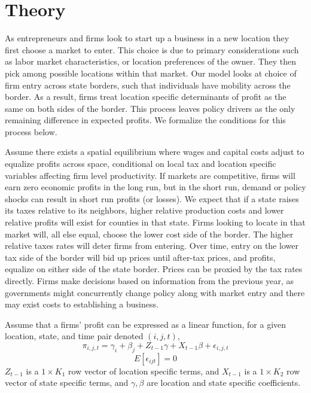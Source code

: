 \section{Theory}

As entrepreneurs and firms look to start up a business in a new location they first choose a market to enter. This choice is due to primary considerations such as labor market characteristics, or location preferences of the owner. They then pick among possible locations within that market. Our model looks at choice of firm entry across state borders, such that individuals have mobility across the border. As a result, firms treat location specific determinants of profit as the same on both sides of the border. This process leaves policy drivers as the only remaining difference in expected profits. We formalize the conditions for this process below. 

Assume there exists a spatial equilibrium where wages and capital costs adjust to equalize profits across space, conditional on local tax and location specific variables affecting firm level productivity. If markets are competitive, firms will earn zero economic profits in the long run, but in the short run, demand or policy shocks can result in short run profits (or losses). We expect that if a state raises its taxes relative to its neighbors, higher relative production costs and lower  relative profits will exist for counties in that state.  Firms looking to locate in that market will, all else equal, choose the lower cost side of the border.  The higher relative taxes rates will  deter firms from entering. Over time,  entry on the lower tax side of the border will bid up prices until after-tax prices, and profits, equalize on either side of the state border. Prices can be proxied by the tax rates directly. Firms make decisions based on information from the previous year, as governments might concurrently change policy along with market entry and there may exist costs to establishing a business.

\begin{assumption}
Assume that a firms' profit can be expressed as a linear function, for a given location, state, and time pair denoted $(i,j,t)$,
\begin{equation}
\pi_{i,j,t} =  \gamma_{i}+\beta_{j}+Z_{t-1}\gamma+X_{t-1}\beta+\epsilon_{i,j,t}
\end{equation}
\begin{equation}
E[\epsilon_{ijt}] = 0
\end{equation}
$Z_{t-1}$ is a $1 \times K_{1}$ row vector of location specific terms, and $X_{t-1}$ is a $1 \times K_{2}$ row vector of state specific terms, and $\gamma, \beta$ are location and state specific coefficients.
\end{assumption}


